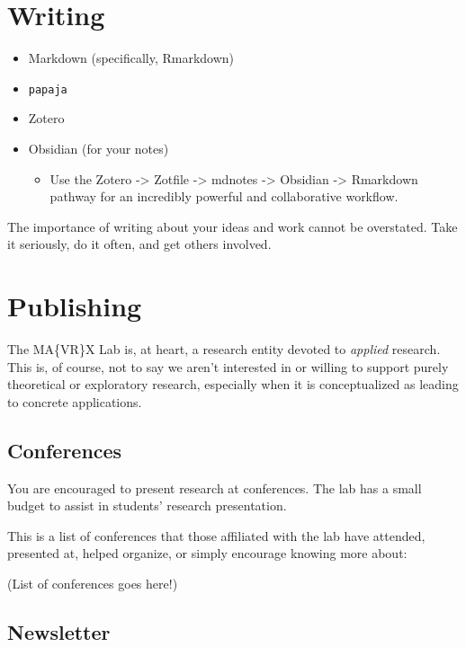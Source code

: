\documentclass[]{tufte-book}
\providecommand{\tightlist}{%
  \setlength{\itemsep}{0pt}\setlength{\parskip}{0pt}}
\begin{document}
\hypertarget{writing}{%
\section{Writing}\label{writing}}

\begin{itemize}
\tightlist
\item
  Markdown (specifically, Rmarkdown)
\item
  \texttt{papaja}
\item
  Zotero
\item
  Obsidian (for your notes)

  \begin{itemize}
  \tightlist
  \item
    Use the Zotero -\textgreater{} Zotfile -\textgreater{} mdnotes -\textgreater{} Obsidian -\textgreater{} Rmarkdown pathway for an incredibly powerful and collaborative workflow.
  \end{itemize}
\end{itemize}

The importance of writing about your ideas and work cannot be overstated. Take it seriously, do it often, and get others involved.

\hypertarget{publishing}{%
\section{Publishing}\label{publishing}}

The MA\{VR\}X Lab is, at heart, a research entity devoted to \emph{applied} research. This is, of course, not to say we aren't interested in or willing to support purely theoretical or exploratory research, especially when it is conceptualized as leading to concrete applications.

\hypertarget{conferences}{%
\subsection{Conferences}\label{conferences}}

You are encouraged to present research at conferences. The lab has a small budget to assist in students' research presentation.

This is a list of conferences that those affiliated with the lab have attended, presented at, helped organize, or simply encourage knowing more about:

(List of conferences goes here!)

\hypertarget{newsletter}{%
\subsection{Newsletter}\label{newsletter}}
\end{document}
